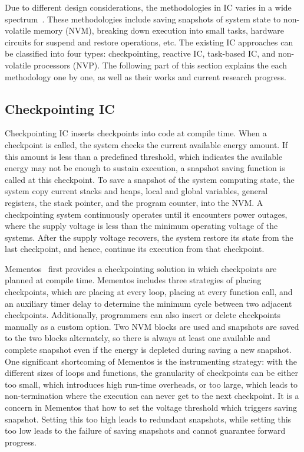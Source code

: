Due to different design considerations, the methodologies in IC varies in a wide spectrum~\cite{sliper2018enabling}. These methodologies include saving snapshots of system state to non-volatile memory (NVM), breaking down execution into small tasks, hardware circuits for suspend and restore operations, etc. The existing IC approaches can be classified into four types: checkpointing, reactive IC, task-based IC, and non-volatile processors (NVP). The following part of this section explains the each methodology one by one, as well as their works and current research progress.

\subsection{Checkpointing IC}

Checkpointing IC inserts checkpoints into code at compile time. When a checkpoint is called, the system checks the current available energy amount. If this amount is less than a predefined threshold, which indicates the available energy may not be enough to sustain execution, a snapshot saving function is called at this checkpoint. To save a snapshot of the system computing state, the system copy current stacks and heaps, local and global variables, general registers, the stack pointer, and the program counter, into the NVM. A checkpointing system continuously operates until it encounters power outages, where the supply voltage is less than the minimum operating voltage of the systems. After the supply voltage recovers, the system restore its state from the last checkpoint, and hence, continue its execution from that checkpoint. 

Mementos~\cite{ransford2012mementos} first provides a checkpointing solution in which checkpoints are planned at compile time. Mementos includes three strategies of placing checkpoints, which are placing at every loop, placing at every function call, and an auxiliary timer delay to determine the minimum cycle between two adjacent checkpoints. Additionally, programmers can also insert or delete checkpoints manually as a custom option. Two NVM blocks are used and snapshots are saved to the two blocks alternately, so there is always at least one available and complete snapshot even if the energy is depleted during saving a new snapshot. One significant shortcoming of Mementos is the instrumenting strategy: with the different sizes of loops and functions, the granularity of checkpoints can be either too small, which introduces high run-time overheads, or too large, which leads to non-termination where the execution can never get to the next checkpoint. It is a concern in Mementos that how to set the voltage threshold which triggers saving snapshot. Setting this too high leads to redundant snapshots, while setting this too low leads to the failure of saving snapshots and cannot guarantee forward progress.

